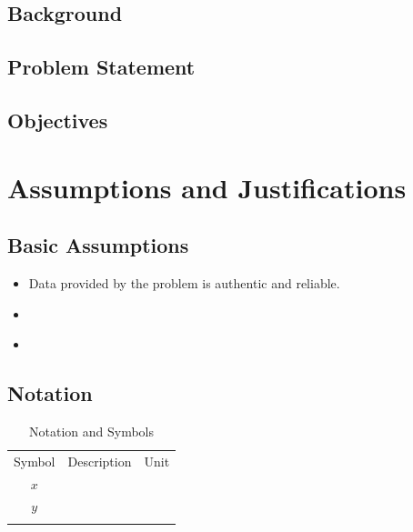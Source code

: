 \documentclass[12pt,a4paper]{article}
\renewcommand{\toprule}{\specialrule{1.5pt}{0pt}{0pt}}
\renewcommand{\midrule}{\specialrule{1.5pt}{0pt}{0pt}}
\renewcommand{\bottomrule}{\specialrule{1.5pt}{0pt}{0pt}}
\begin{document}
\subsection{Background}

\subsection{Problem Statement}

\subsection{Objectives}

\section{Assumptions and Justifications}

\subsection{Basic Assumptions}
\begin{itemize}
    \item Data provided by the problem is authentic and reliable.
    \item \underline{\hspace{6cm}}
    \item \underline{\hspace{6cm}}
\end{itemize}

\subsection{Notation}
\begin{table}[htbp]
    \centering
    \caption{Notation and Symbols}
    \label{tab:symbols}
    \begin{tabular}{ccc}
        \toprule
        Symbol & Description & Unit \\
        \midrule
        $x$ & \underline{\hspace{3cm}} & \underline{\hspace{2cm}} \\
        $y$ & \underline{\hspace{3cm}} & \underline{\hspace{2cm}} \\
        \bottomrule
    \end{tabular}
\end{table}
\end{document}
